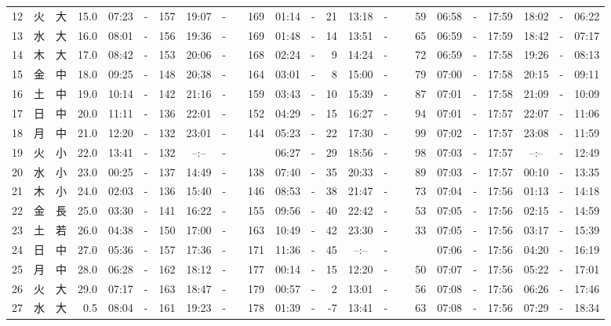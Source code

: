 \documentclass[12pt,a4j]{jsarticle}
\begin{document}
\begin{table}[htbp]
\begin{center}
{\begin{tabular}{|rc|cr|ccrccr|ccrccr|ccc|ccc|}
12 & 火 & 大 & 15.0 &  07:23 &-& 157 &  19:07 &-& 169 &  01:14 &-&  21 &  13:18 &-&  59 & 06:58 & -& 17:59 & 18:02 & -& 06:22 \\
13 & 水 & 大 & 16.0 &  08:01 &-& 156 &  19:36 &-& 169 &  01:48 &-&  14 &  13:51 &-&  65 & 06:59 & -& 17:59 & 18:42 & -& 07:17 \\
14 & 木 & 大 & 17.0 &  08:42 &-& 153 &  20:06 &-& 168 &  02:24 &-&   9 &  14:24 &-&  72 & 06:59 & -& 17:58 & 19:26 & -& 08:13 \\
15 & 金 & 中 & 18.0 &  09:25 &-& 148 &  20:38 &-& 164 &  03:01 &-&   8 &  15:00 &-&  79 & 07:00 & -& 17:58 & 20:15 & -& 09:11 \\
16 & 土 & 中 & 19.0 &  10:14 &-& 142 &  21:16 &-& 159 &  03:43 &-&  10 &  15:39 &-&  87 & 07:01 & -& 17:58 & 21:09 & -& 10:09 \\
17 & 日 & 中 & 20.0 &  11:11 &-& 136 &  22:01 &-& 152 &  04:29 &-&  15 &  16:27 &-&  94 & 07:01 & -& 17:57 & 22:07 & -& 11:06 \\
18 & 月 & 中 & 21.0 &  12:20 &-& 132 &  23:01 &-& 144 &  05:23 &-&  22 &  17:30 &-&  99 & 07:02 & -& 17:57 & 23:08 & -& 11:59 \\
19 & 火 & 小 & 22.0 &  13:41 &-& 132 &  --:-- &-&~~~~~ &  06:27 &-&  29 &  18:56 &-&  98 & 07:03 & -& 17:57 & --:-- & -& 12:49 \\
20 & 水 & 小 & 23.0 &  00:25 &-& 137 &  14:49 &-& 138 &  07:40 &-&  35 &  20:33 &-&  89 & 07:03 & -& 17:57 & 00:10 & -& 13:35 \\
21 & 木 & 小 & 24.0 &  02:03 &-& 136 &  15:40 &-& 146 &  08:53 &-&  38 &  21:47 &-&  73 & 07:04 & -& 17:56 & 01:13 & -& 14:18 \\
22 & 金 & 長 & 25.0 &  03:30 &-& 141 &  16:22 &-& 155 &  09:56 &-&  40 &  22:42 &-&  53 & 07:05 & -& 17:56 & 02:15 & -& 14:59 \\
23 & 土 & 若 & 26.0 &  04:38 &-& 150 &  17:00 &-& 163 &  10:49 &-&  42 &  23:30 &-&  33 & 07:05 & -& 17:56 & 03:17 & -& 15:39 \\
24 & 日 & 中 & 27.0 &  05:36 &-& 157 &  17:36 &-& 171 &  11:36 &-&  45 &  --:-- &-&~~~~~ & 07:06 & -& 17:56 & 04:20 & -& 16:19 \\
25 & 月 & 中 & 28.0 &  06:28 &-& 162 &  18:12 &-& 177 &  00:14 &-&  15 &  12:20 &-&  50 & 07:07 & -& 17:56 & 05:22 & -& 17:01 \\
26 & 火 & 大 & 29.0 &  07:17 &-& 163 &  18:47 &-& 179 &  00:57 &-&   2 &  13:01 &-&  56 & 07:08 & -& 17:56 & 06:26 & -& 17:46 \\
27 & 水 & 大 &  0.5 &  08:04 &-& 161 &  19:23 &-& 178 &  01:39 &-&  -7 &  13:41 &-&  63 & 07:08 & -& 17:56 & 07:29 & -& 18:34 \\

\end{tabular}}
\end{center}
\end{table}
\end{document}
